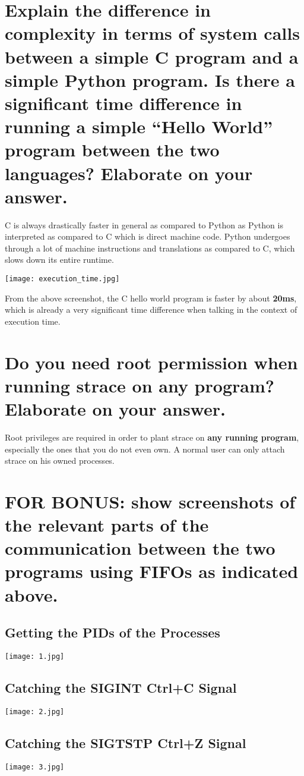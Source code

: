 \documentclass[conference]{IEEEtran}
\newcommand\tab[1][0.5cm]{\hspace*{#1}}
\begin{document}
\section{Explain the difference in complexity in terms of system calls between a simple
C program and a simple Python program. Is there a significant time difference
in running a simple “Hello World” program between the two languages?
Elaborate on your answer.}
C is always drastically faster in general as compared to Python as Python is interpreted as compared to C which is direct machine code. Python undergoes through a lot of machine instructions and translations as compared to C, which slows down its entire runtime.
\begin{center}
\texttt{[image: execution\_time.jpg]}
\end{center}
\tab From the above screenshot, the C hello world program is faster by about \textbf{20ms}, which is already a very significant time difference when talking in the context of execution time.

\section{Do you need root permission when running strace on any program? Elaborate
on your answer.}
Root privileges are required in order to plant strace on \textbf{any running program}, especially the ones that you do not even own. A normal user can only attach strace on his owned processes.
\section{FOR BONUS: show screenshots of the relevant parts of the communication
between the two programs using FIFOs as indicated above.}
\subsection{Getting the PIDs of the Processes}
\begin{center}
\texttt{[image: 1.jpg]}
\end{center}
\subsection{Catching the SIGINT Ctrl+C Signal}
\begin{center}
\texttt{[image: 2.jpg]}
\end{center}
\subsection{Catching the SIGTSTP Ctrl+Z Signal}
\begin{center}
\texttt{[image: 3.jpg]}
\end{center}
\end{document}
